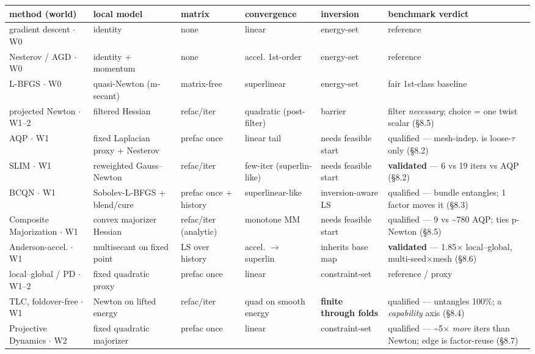 \documentclass{egpubl}
\begin{document}
\begin{table}[t]\centering\footnotesize\begin{tabularx}{\textwidth}{lYYYYY}
\toprule method (world) & local model & matrix & convergence & inversion & benchmark verdict \\ \midrule
gradient descent $\cdot$ W0 & identity & none & linear & energy-set & reference \\
Nesterov / AGD $\cdot$ W0 & identity + momentum & none & accel. 1st-order & energy-set & reference \\
L-BFGS $\cdot$ W0 & quasi-Newton (m-secant) & matrix-free & superlinear & energy-set & fair 1st-class baseline \\
projected Newton $\cdot$ W1--2 & filtered Hessian & refac/iter & quadratic (post-filter) & barrier & filter \emph{necessary}; choice = one twist scalar (\S8.5) \\
AQP $\cdot$ W1 & fixed Laplacian proxy + Nesterov & prefac once & linear tail & needs feasible start & qualified --- mesh-indep. is loose-$\tau$ only (\S8.2) \\
SLIM $\cdot$ W1 & reweighted Gauss--Newton & refac/iter & few-iter (superlin-like) & needs feasible start & \textbf{validated} --- 6 vs 19 iters vs AQP (\S8.2) \\
BCQN $\cdot$ W1 & Sobolev-L-BFGS + blend/cure & prefac once + history & superlinear-like & inversion-aware LS & qualified --- bundle entangles; 1 factor moves it (\S8.3) \\
Composite Majorization $\cdot$ W1 & convex majorizer Hessian & refac/iter (analytic) & monotone MM & needs feasible start & qualified --- 9 vs \textasciitilde{}780 AQP; ties p-Newton (\S8.5) \\
Anderson-accel. $\cdot$ W1 & multisecant on fixed point & LS over history & accel. $\rightarrow$ superlin & inherits base map & \textbf{validated} --- 1.85$\times$ local--global, multi-seed$\times$mesh (\S8.6) \\
local--global / PD $\cdot$ W1--2 & fixed quadratic proxy & prefac once & linear & constraint-set & reference / proxy \\
TLC, foldover-free $\cdot$ W1 & Newton on lifted energy & refac/iter & quad on smooth energy & \textbf{finite through folds} & qualified --- untangles 100\%; a \emph{capability} axis (\S8.4) \\
Projective Dynamics $\cdot$ W2 & fixed quadratic majorizer & prefac once & linear & constraint-set & qualified --- \textasciitilde{}5$\times$ \emph{more} iters than Newton; edge is factor-reuse (\S8.7) \\

\end{tabularx}
\end{table}
\end{document}
